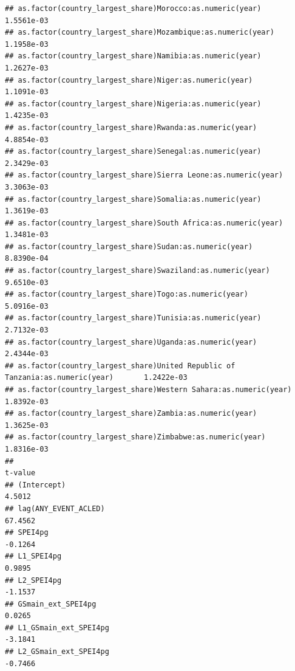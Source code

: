 \documentclass[
  a4paper,
]{article}
\begin{document}
\begin{verbatim}
## as.factor(country_largest_share)Morocco:as.numeric(year)                           1.5561e-03
## as.factor(country_largest_share)Mozambique:as.numeric(year)                        1.1958e-03
## as.factor(country_largest_share)Namibia:as.numeric(year)                           1.2627e-03
## as.factor(country_largest_share)Niger:as.numeric(year)                             1.1091e-03
## as.factor(country_largest_share)Nigeria:as.numeric(year)                           1.4235e-03
## as.factor(country_largest_share)Rwanda:as.numeric(year)                            4.8854e-03
## as.factor(country_largest_share)Senegal:as.numeric(year)                           2.3429e-03
## as.factor(country_largest_share)Sierra Leone:as.numeric(year)                      3.3063e-03
## as.factor(country_largest_share)Somalia:as.numeric(year)                           1.3619e-03
## as.factor(country_largest_share)South Africa:as.numeric(year)                      1.3481e-03
## as.factor(country_largest_share)Sudan:as.numeric(year)                             8.8390e-04
## as.factor(country_largest_share)Swaziland:as.numeric(year)                         9.6510e-03
## as.factor(country_largest_share)Togo:as.numeric(year)                              5.0916e-03
## as.factor(country_largest_share)Tunisia:as.numeric(year)                           2.7132e-03
## as.factor(country_largest_share)Uganda:as.numeric(year)                            2.4344e-03
## as.factor(country_largest_share)United Republic of Tanzania:as.numeric(year)       1.2422e-03
## as.factor(country_largest_share)Western Sahara:as.numeric(year)                    1.8392e-03
## as.factor(country_largest_share)Zambia:as.numeric(year)                            1.3625e-03
## as.factor(country_largest_share)Zimbabwe:as.numeric(year)                          1.8316e-03
##                                                                                   t-value
## (Intercept)                                                                        4.5012
## lag(ANY_EVENT_ACLED)                                                              67.4562
## SPEI4pg                                                                           -0.1264
## L1_SPEI4pg                                                                         0.9895
## L2_SPEI4pg                                                                        -1.1537
## GSmain_ext_SPEI4pg                                                                 0.0265
## L1_GSmain_ext_SPEI4pg                                                             -3.1841
## L2_GSmain_ext_SPEI4pg                                                             -0.7466

\end{verbatim}
\end{document}
